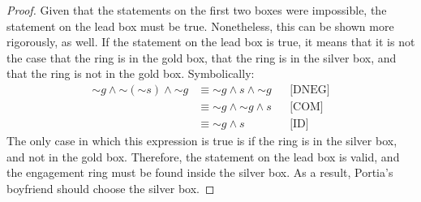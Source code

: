 \documentclass[11pt, notitlepage]{article}
\newcommand*{\oldneg}{\mathord{\sim}}
\begin{document}
\begin{enumerate}
\begin{proof}
Given that the statements on the first two boxes were impossible, the statement on the lead box must be true. Nonetheless, this can be shown more rigorously, as well. If the statement on the lead box is true, it means that it is not the case that the ring is in the gold box, that the ring is in the silver box, and that the ring is not in the gold box. Symbolically:
\begin{align*}
	\oldneg g \wedge \oldneg (\oldneg s) \wedge \oldneg g &\equiv \oldneg g \wedge s \wedge \oldneg g &&\textrm{[DNEG]}\\
	&\equiv \oldneg g \wedge \oldneg g \wedge s &&\textrm{[COM]}\\
	&\equiv \oldneg g \wedge s &&\textrm{[ID]}
\end{align*}
The only case in which this expression is true is if the ring is in the silver box, and not in the gold box. Therefore, the statement on the lead box is valid, and the engagement ring must be found inside the silver box. As a result, Portia's boyfriend should choose the silver box. \qedhere

\end{proof}

\end{enumerate}
\end{document}
